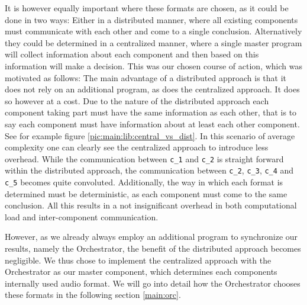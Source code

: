 It is however equally important where these formats are chosen, as it could be done in two ways:
Either in a distributed manner, where all existing components must communicate with each other and come to a single conclusion.
Alternatively they could be determined in a centralized manner, where a single master program will collect information about each component and then based on this information will make a decision.
This was our chosen course of action, which was motivated as follows:
The main advantage of a distributed approach is that it does not rely on an additional program, as does the centralized approach.
It does so however at a cost. 
Due to the nature of the distributed approach each component taking part must have the same information as each other, that is to say each component must have information about at least each other component.
See for example figure \ref{pic:main:lib:central_vs_dist}.
In this scenario of average complexity one can clearly see the centralized approach to introduce less overhead.
While the communication between \texttt{c\_1} and \texttt{c\_2} is straight forward within the distributed approach, the communication between \texttt{c\_2}, \texttt{c\_3}, \texttt{c\_4} and \texttt{c\_5} becomes quite convoluted.
Additionally, the way in which each format is determined must be deterministic, as each component must come to the same conclusion.
All this results in a not insignificant overhead in both computational load and inter-component communication.

However, as we already always employ an additional program to synchronize our results, namely the Orchestrator, the benefit of the distributed approach becomes negligible.
We thus chose to implement the centralized approach with the Orchestrator as our master component, which determines each components internally used audio format.
We will go into detail how the Orchestrator chooses these formats in the following section \ref{main:orc}.

